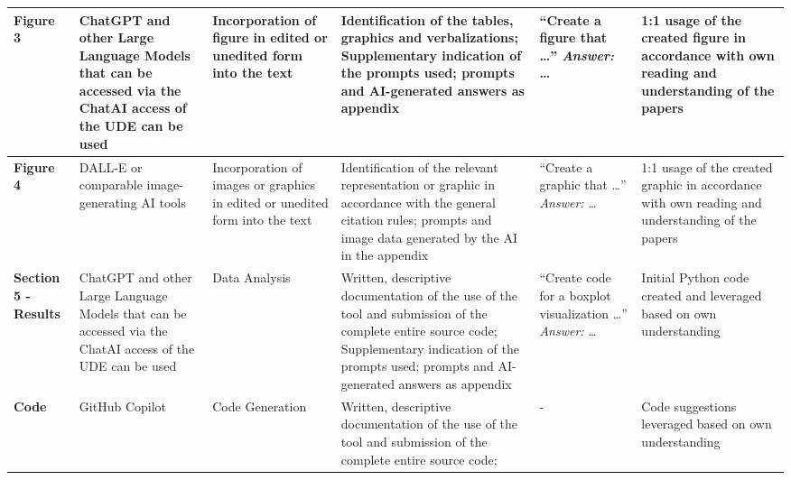 \begin{longtable}{|R{1.7cm}|R{2.3cm}|R{2.3cm}|R{2.4cm}|R{2.5cm}|R{2.6cm}|}
\hline
\textbf{Figure 3} & ChatGPT and other Large Language Models that can be accessed via the ChatAI access of the UDE can be used & Incorpo\-ration of figure in edited or unedited form into the text & Identifi\-cation of the tables, graphics and verbalizations; Supplementary indication of the prompts used; prompts and AI-generated answers as appendix & \enquote{Create a figure that …} \enspace\textit{Answer:} … & 1:1 usage of the created figure in accordance with own reading and understanding of the papers \\
\hline
\textbf{Figure 4} & DALL-E or comparable image-generating AI tools & Incorpo\-ration of images or graphics in edited or unedited form into the text & Identifi\-cation of the relevant representation or graphic in accordance with the general citation rules; prompts and image data generated by the AI in the appendix & \enquote{Create a graphic that …} \enspace\textit{Answer:} … & 1:1 usage of the created graphic in accordance with own reading and understanding of the papers \\
\hline
\textbf{Section 5 - Results} & ChatGPT and other Large Language Models that can be accessed via the ChatAI access of the UDE can be used & Data Analysis & Written, descriptive documentation of the use of the tool and submission of the complete entire source code; Supplementary indication of the prompts used; prompts and AI-generated answers as appendix & \enquote{Create code for a boxplot visualization …} \enspace\textit{Answer:} … & Initial Python code created and leveraged based on own understanding \\
\hline
\textbf{Code} & GitHub Copilot & Code Generation & Written, descriptive documentation of the use of the tool and submission of the complete entire source code; & - & Code suggestions leveraged based on own understanding \\
\hline
\end{longtable}

